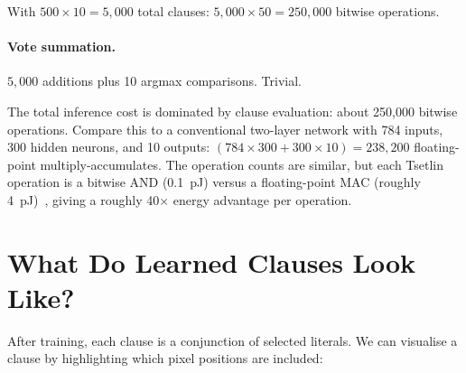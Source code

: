 With $500 \times 10 = 5{,}000$ total clauses:
$5{,}000 \times 50 = 250{,}000$ bitwise operations.

\paragraph{Vote summation.}
$5{,}000$ additions plus 10 argmax comparisons. Trivial.

\begin{engineernote}
The total inference cost is dominated by clause evaluation: about
250,000 bitwise operations. Compare this to a conventional two-layer
network with 784 inputs, 300 hidden neurons, and 10 outputs:
$(784 \times 300 + 300 \times 10) = 238{,}200$ floating-point
multiply-accumulates. The operation counts are similar, but each
Tsetlin operation is a bitwise AND (0.1~pJ) versus a floating-point
MAC (roughly 4~pJ)~\cite{horowitz2014energy}, giving a roughly 40$\times$ energy advantage per
operation.
\end{engineernote}


\section{What Do Learned Clauses Look Like?}
\label{sec:learned-clauses}

After training, each clause is a conjunction of selected literals.
We can visualise a clause by highlighting which pixel positions
are included:


